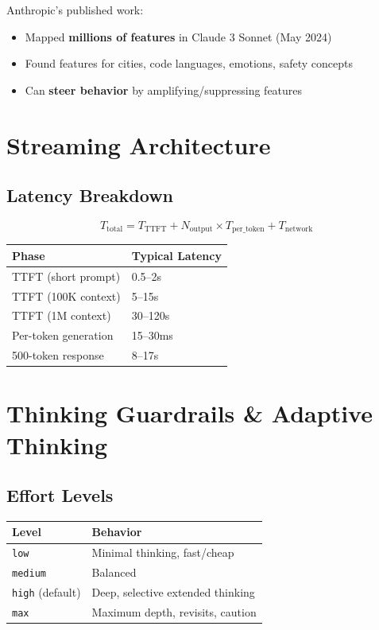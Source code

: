 \documentclass[11pt,a4paper]{article}
\begin{document}
Anthropic's published work:
\begin{itemize}
  \item Mapped \textbf{millions of features} in Claude 3 Sonnet (May 2024)
  \item Found features for cities, code languages, emotions, safety concepts
  \item Can \textbf{steer behavior} by amplifying/suppressing features
\end{itemize}

\section{Streaming Architecture}

\subsection{Latency Breakdown}

$$T_{\text{total}} = T_{\text{TTFT}} + N_{\text{output}} \times T_{\text{per\_token}} + T_{\text{network}}$$

\begin{center}
\begin{tabular}{ll}
\toprule
\textbf{Phase} & \textbf{Typical Latency} \\
\midrule
TTFT (short prompt) & 0.5--2s \\
TTFT (100K context) & 5--15s \\
TTFT (1M context) & 30--120s \\
Per-token generation & 15--30ms \\
500-token response & 8--17s \\
\bottomrule
\end{tabular}
\end{center}

\section{Thinking Guardrails \& Adaptive Thinking}

\subsection{Effort Levels}

\begin{center}
\begin{tabular}{ll}
\toprule
\textbf{Level} & \textbf{Behavior} \\
\midrule
\texttt{low} & Minimal thinking, fast/cheap \\
\texttt{medium} & Balanced \\
\texttt{high} (default) & Deep, selective extended thinking \\
\texttt{max} & Maximum depth, revisits, caution \\
\bottomrule
\end{tabular}
\end{center}
\end{document}
